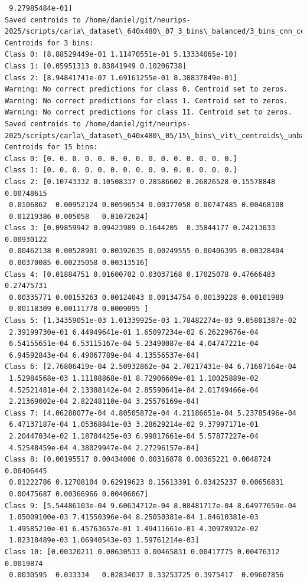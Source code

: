 \begin{verbatim}
 9.27985484e-01]
Saved centroids to /home/daniel/git/neurips-2025/scripts/carla\_dataset\_640x480\_07_3_bins\_balanced/3_bins_cnn_centroids\_balanced.npy
Centroids for 3 bins:
Class 0: [8.88529449e-01 1.11470551e-01 5.13334065e-10]
Class 1: [0.05951313 0.83841949 0.10206738]
Class 2: [8.94841741e-07 1.69161255e-01 8.30837849e-01]
Warning: No correct predictions for class 0. Centroid set to zeros.
Warning: No correct predictions for class 1. Centroid set to zeros.
Warning: No correct predictions for class 11. Centroid set to zeros.
Saved centroids to /home/daniel/git/neurips-2025/scripts/carla\_dataset\_640x480\_05/15\_bins\_vit\_centroids\_unbalanced.npy
Centroids for 15 bins:
Class 0: [0. 0. 0. 0. 0. 0. 0. 0. 0. 0. 0. 0. 0. 0. 0.]
Class 1: [0. 0. 0. 0. 0. 0. 0. 0. 0. 0. 0. 0. 0. 0. 0.]
Class 2: [0.10743332 0.10508337 0.28586602 0.26826528 0.15578848 0.00748615
 0.0106862  0.00952124 0.00596534 0.00377058 0.00747485 0.00468108
 0.01219386 0.005058   0.01072624]
Class 3: [0.09859942 0.09423989 0.1644205  0.35844177 0.24213033 0.00930122
 0.00462138 0.00528901 0.00392635 0.00249555 0.00406395 0.00328404
 0.00370085 0.00235058 0.00313516]
Class 4: [0.01884751 0.01600702 0.03037168 0.17025078 0.47666483 0.27475731
 0.00335771 0.00153263 0.00124043 0.00134754 0.00139228 0.00101989
 0.00118309 0.00111778 0.0009095 ]
Class 5: [1.34359051e-03 1.01339925e-03 1.78482274e-03 9.05801387e-02
 2.39199730e-01 6.44949641e-01 1.65097234e-02 6.26229676e-04
 6.54155651e-04 6.53115167e-04 5.23490087e-04 4.04747221e-04
 6.94592843e-04 6.49067789e-04 4.13556537e-04]
Class 6: [2.76806419e-04 2.50932862e-04 2.70217431e-04 6.71687164e-04
 1.52984568e-03 1.11108868e-01 8.72906609e-01 1.10025889e-02
 4.52521481e-04 2.13388142e-04 2.85590641e-04 2.01749466e-04
 2.21369002e-04 2.82248110e-04 3.25576169e-04]
Class 7: [4.06288077e-04 4.80505872e-04 4.21186651e-04 5.23785496e-04
 6.47137187e-04 1.05368841e-03 3.28629214e-02 9.37997171e-01
 2.20447034e-02 1.18704425e-03 6.99817661e-04 5.57877227e-04
 4.52548459e-04 4.38029947e-04 2.27296157e-04]
Class 8: [0.00195517 0.00434006 0.00316878 0.00365221 0.0048724  0.00406445
 0.01222786 0.12708104 0.62919623 0.15613391 0.03425237 0.00656831
 0.00475687 0.00366966 0.00406067]
Class 9: [5.54486103e-04 9.60634712e-04 8.08481717e-04 8.64977659e-04
 1.05009100e-03 7.41550396e-04 8.25050381e-04 1.84610381e-03
 1.49585210e-01 6.45763657e-01 1.49411661e-01 4.30978932e-02
 1.82318489e-03 1.06940543e-03 1.59761214e-03]
Class 10: [0.00320211 0.00630533 0.00465831 0.00417775 0.00476312 0.0019874
 0.0030595  0.033334   0.02834037 0.33253725 0.3975417  0.09607856

\end{verbatim}
